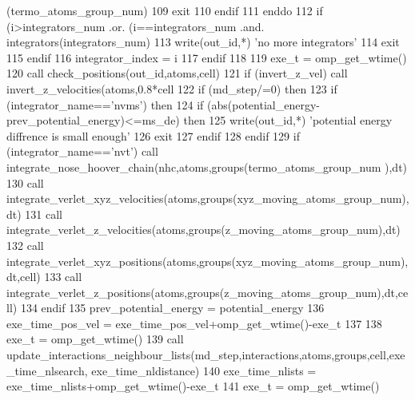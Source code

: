 \begin{DoxyCode}
      (termo\_atoms\_group\_num)%
109                 \textcolor{keywordflow}{exit}
110 \textcolor{keywordflow}{            endif}
111 \textcolor{keywordflow}{        enddo}
112         \textcolor{keywordflow}{if} (i>integrators\_num .or. (i==integrators\_num .and. integrators(integrators\_num)%
113             \textcolor{keyword}{write}(out\_id,*) \textcolor{stringliteral}{'no more integrators'}
114             \textcolor{keywordflow}{exit}
115 \textcolor{keywordflow}{        endif}
116         integrator\_index = i
117 \textcolor{keywordflow}{    endif}
118 
119     exe\_t = omp\_get\_wtime()
120     \textcolor{keyword}{call }check\_positions(out\_id,atoms,cell)
121     \textcolor{keywordflow}{if} (invert\_z\_vel) \textcolor{keyword}{call }invert\_z\_velocities(atoms,0.8*cell%
122     \textcolor{keywordflow}{if} (md\_step/=0) \textcolor{keywordflow}{then}
123         \textcolor{keywordflow}{if} (integrator\_name==\textcolor{stringliteral}{'nvms'}) \textcolor{keywordflow}{then}
124             \textcolor{keywordflow}{if} (abs(potential\_energy-prev\_potential\_energy)<=ms\_de) \textcolor{keywordflow}{then}
125                 \textcolor{keyword}{write}(out\_id,*) \textcolor{stringliteral}{'potential energy diffrence is small enough'}
126                 \textcolor{keywordflow}{exit}
127 \textcolor{keywordflow}{            endif}
128 \textcolor{keywordflow}{        endif}
129         \textcolor{keywordflow}{if} (integrator\_name==\textcolor{stringliteral}{'nvt'}) \textcolor{keyword}{call }integrate\_nose\_hoover\_chain(nhc,atoms,groups(termo\_atoms\_group\_num
      ),dt)
130         \textcolor{keyword}{call }integrate\_verlet\_xyz\_velocities(atoms,groups(xyz\_moving\_atoms\_group\_num),dt)
131         \textcolor{keyword}{call }integrate\_verlet\_z\_velocities(atoms,groups(z\_moving\_atoms\_group\_num),dt)
132         \textcolor{keyword}{call }integrate\_verlet\_xyz\_positions(atoms,groups(xyz\_moving\_atoms\_group\_num),dt,cell)
133         \textcolor{keyword}{call }integrate\_verlet\_z\_positions(atoms,groups(z\_moving\_atoms\_group\_num),dt,cell)
134 \textcolor{keywordflow}{    endif}
135     prev\_potential\_energy = potential\_energy
136     exe\_time\_pos\_vel = exe\_time\_pos\_vel+omp\_get\_wtime()-exe\_t
137 
138     exe\_t = omp\_get\_wtime()
139     \textcolor{keyword}{call }update\_interactions\_neighbour\_lists(md\_step,interactions,atoms,groups,cell,exe\_time\_nlsearch,
      exe\_time\_nldistance)
140     exe\_time\_nlists = exe\_time\_nlists+omp\_get\_wtime()-exe\_t
141     exe\_t = omp\_get\_wtime()

\end{DoxyCode}
